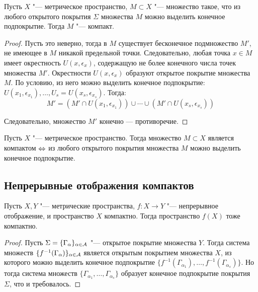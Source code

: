 \begin{theorem}
    Пусть $X$ "--- метрическое пространство, $M \subset X$ "--- множество такое, что из любого открытого покрытия $\Sigma$ множества $M$ можно выделить конечное подпокрытие. Тогда $M$ "--- компакт.
\end{theorem}

\begin{proof}
    Пусть это неверно, тогда в $M$ существует бесконечное подмножество $M'$, не имеющее в $M$ никакой предельной точки. Следовательно, любая точка $x \in M$ имеет окрестность $U(x, \epsilon_x)$, содержащую не более конечного числа точек множества $M'$. Окрестности $U(x, \epsilon_x)$ образуют открытое покрытие множества $M$. По условию, из него можно выделить конечное подпокрытие: $U(x_1, \epsilon_{x_1}), \ldots, U_s = U(x_s, \epsilon_{x_s})$. Тогда:
    \[M' = \left(M'\cap U(x_1, \epsilon_{x_1})\right)\cup\dotsb\cup \left(M'\cap U(x_s, \epsilon_{x_s})\right)\]
    
    Следовательно, множество $M'$ конечно --- противоречие.
\end{proof}

\begin{corollary}
    Пусть $X$ "--- метрическое пространство. Тогда множество $M \subset X$ является компактом $\Leftrightarrow$ из любого открытого покрытия множества $M$ можно выделить конечное подпокрытие.
\end{corollary}

\subsection{Непрерывные отображения компактов}

\begin{theorem}\label{compactimage}
	Пусть $X, Y$ "--- метрические пространства, $f : X \to Y$ "--- непрерывное отображение, и пространство $X$ компактно. Тогда пространство $f(X)$ тоже компактно.
\end{theorem}

\begin{proof}
    Пусть $\Sigma = \lbrace \Gamma_{\alpha} \rbrace_{\alpha \in \mathcal A}$ "--- открытое покрытие множества $Y$. Тогда система множеств $\lbrace f^{-1}(\Gamma_{\alpha})\rbrace_{\alpha \in \mathcal A}$ является открытым покрытием множества $X$, из которого можно выделить конечное подпокрытие $\lbrace f^{-1}(\Gamma_{\alpha_1}), \ldots, f^{-1}(\Gamma_{\alpha_s})\rbrace$. Но тогда система множеств $\lbrace \Gamma_{\alpha_1}, \ldots, \Gamma_{\alpha_s}\rbrace$ образует конечное подпокрытие покрытия $\Sigma$, что и требовалось.
\end{proof}

